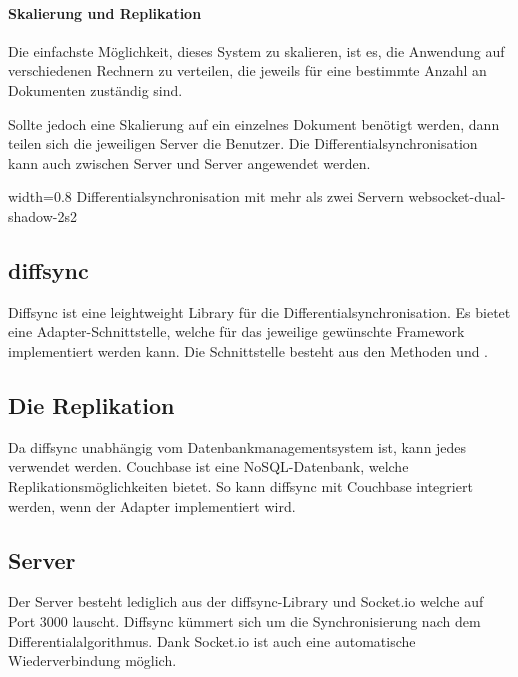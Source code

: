 \paragraph{Skalierung und Replikation}
Die einfachste Möglichkeit, dieses System zu skalieren, ist es, die Anwendung auf verschiedenen Rechnern zu verteilen, die jeweils für eine bestimmte Anzahl an Dokumenten zuständig sind. 

Sollte jedoch eine Skalierung auf ein einzelnes Dokument benötigt werden, dann teilen sich die jeweiligen Server die Benutzer. Die Differentialsynchronisation kann auch zwischen Server und Server angewendet werden. 


{width=0.8\linewidth}
{Differentialsynchronisation mit mehr als zwei Servern \cite{websocket-differential}}
{websocket-dual-shadow-2s2}


\subsection{diffsync}
Diffsync ist eine leightweight Library für die Differentialsynchronisation. Es bietet eine Adapter-Schnittstelle, welche für das jeweilige gewünschte Framework implementiert werden kann. Die Schnittstelle besteht aus den Methoden  und .

\subsection{Die Replikation}
Da diffsync unabhängig vom Datenbankmanagementsystem ist, kann jedes verwendet werden. Couchbase ist eine NoSQL-Datenbank, welche Replikationsmöglichkeiten bietet. So kann diffsync mit Couchbase integriert werden, wenn der Adapter implementiert wird.

\subsection{Server}
Der Server besteht lediglich aus der diffsync-Library und Socket.io welche auf Port 3000 lauscht. Diffsync kümmert sich um die Synchronisierung nach dem Differentialalgorithmus. Dank Socket.io ist auch eine automatische Wiederverbindung möglich.


